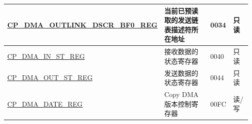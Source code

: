 \begin{longtable}{ | p{6cm} | p{7.2cm} | p{1.3cm} | p{1cm} | }
\hyperref[regdesc:CPDMAOUTLINKDSCRBF0REG]{CP\_DMA\_OUTLINK\_DSCR\_BF0\_REG} & 当前已预读取的发送链表描述符所在地址 & \hexprefix{}0034 & 只读 \\ \hline
\hyperref[regdesc:CPDMAINSTREG]{CP\_DMA\_IN\_ST\_REG} & 接收数据的状态寄存器 & \hexprefix{}0040 & 只读 \\ \hline
\hyperref[regdesc:CPDMAOUTSTREG]{CP\_DMA\_OUT\_ST\_REG} & 发送数据的状态寄存器 & \hexprefix{}0044 & 只读 \\ \hline
\hyperref[regdesc:CPDMADATEREG]{CP\_DMA\_DATE\_REG} & Copy DMA 版本控制寄存器 & \hexprefix{}00FC & 读/写 \\ \hline
\end{longtable}

